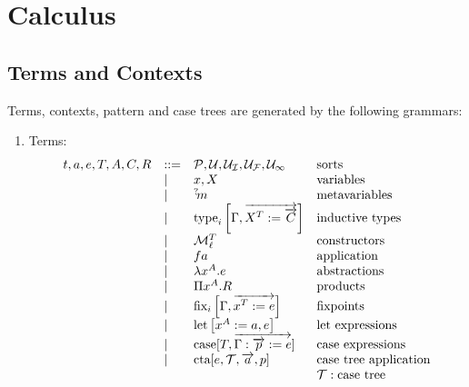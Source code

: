 \section{Calculus}





\subsection{Terms and Contexts}


Terms, contexts, pattern and case trees are generated by the following grammars:

\begin{enumerate}
    \item Terms:
        $$
        \begin{array}{lllll} 
            t,a,e,T,A,C,R
            &::=&
            {\mathcal P}, {\mathcal U}, {{\mathcal U}_\mathcal I}, {{\mathcal U}_\mathcal F}, {{\mathcal U}_\infty}
            &\text{sorts}
            \\
            &\mid&
            x, X
            &\text{variables}
            \\
            &\mid&
            {{}^? \kern-0.2em m}
            &\text{metavariables}
            \\
            &\mid&
            {\text{type}}_i\left[ {\Gamma , {\overrightarrow {X^T := {\overrightarrow {C}}}}} \right]
            & \text{inductive types}
            \\
            &\mid&
            {\cal M}^T_{\ell}
            &\text{constructors}
            \\
            &\mid&
            f a
            & \text{application}
            \\
            &\mid&
            \lambda x^A. e
            & \text{abstractions}
            \\
            &\mid&
            \Pi x^A. R
            & \text{products}
            \\
            &\mid&
            {\text{fix}}_i\left[ {\Gamma, {\overrightarrow { x^T := e}}} \right]
            & \text{fixpoints}
            \\
            &\mid&
            {\text{let}}\left[ {x^A := a, e} \right]
            & \text{let expressions}
            \\
            &\mid&
            {\text{case}}[T, {\overrightarrow {\Gamma: {\overrightarrow {p}} := e}}]
            & \text{case expressions}
            \\
            &\mid&
            {\text{cta}}[e, {\mathcal T}, {\overrightarrow {a}}, p]
            &\text{case tree application}
            \\
            &&& {\mathcal T}: \text{case tree}
         \end{array}
        $$


\end{enumerate}
